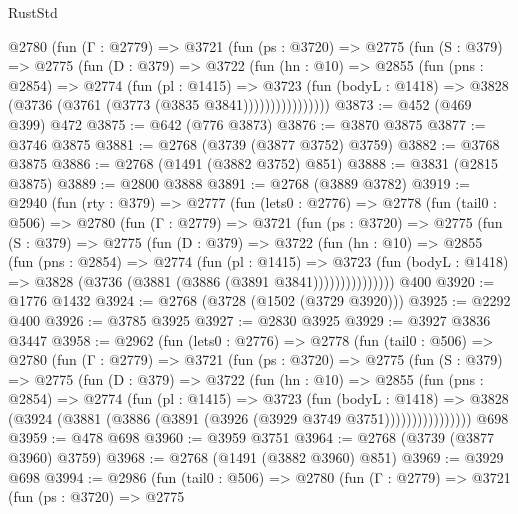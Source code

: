 \begin{lexlean}{RustStd}
\begin{coremodule}
          @2780
            (fun (Γ : @2779) =>
            @3721
              (fun (ps : @3720) =>
              @2775
                (fun (S : @379) =>
                @2775
                  (fun (D : @379) =>
                  @3722
                    (fun (hn : @10) =>
                    @2855
                      (fun (pns : @2854) =>
                      @2774
                        (fun (pl : @1415) =>
                        @3723
                          (fun (bodyL : @1418) =>
                          @3828 (@3736 (@3761 (@3773 (@3835 @3841))))))))))))))))
@3873 := @452 (@469 @399) @472
@3875 := @642 (@776 @3873)
@3876 := @3870 @3875
@3877 := @3746 @3875
@3881 := @2768 (@3739 (@3877 @3752) @3759)
@3882 := @3768 @3875
@3886 := @2768 (@1491 (@3882 @3752) @851)
@3888 := @3831 (@2815 @3875)
@3889 := @2800 @3888
@3891 := @2768 (@3889 @3782)
@3919 := @2940
    (fun (rty : @379) =>
    @2777
      (fun (lets0 : @2776) =>
      @2778
        (fun (tail0 : @506) =>
        @2780
          (fun (Γ : @2779) =>
          @3721
            (fun (ps : @3720) =>
            @2775
              (fun (S : @379) =>
              @2775
                (fun (D : @379) =>
                @3722
                  (fun (hn : @10) =>
                  @2855
                    (fun (pns : @2854) =>
                    @2774
                      (fun (pl : @1415) =>
                      @3723
                        (fun (bodyL : @1418) =>
                        @3828 (@3736 (@3881 (@3886 (@3891 @3841)))))))))))))))
    @400
@3920 := @1776 @1432
@3924 := @2768 (@3728 (@1502 (@3729 @3920)))
@3925 := @2292 @400
@3926 := @3785 @3925
@3927 := @2830 @3925
@3929 := @3927 @3836 @3447
@3958 := @2962
    (fun (lets0 : @2776) =>
    @2778
      (fun (tail0 : @506) =>
      @2780
        (fun (Γ : @2779) =>
        @3721
          (fun (ps : @3720) =>
          @2775
            (fun (S : @379) =>
            @2775
              (fun (D : @379) =>
              @3722
                (fun (hn : @10) =>
                @2855
                  (fun (pns : @2854) =>
                  @2774
                    (fun (pl : @1415) =>
                    @3723
                      (fun (bodyL : @1418) =>
                      @3828 (@3924 (@3881 (@3886 (@3891 (@3926 (@3929 @3749 @3751))))))))))))))))
    @698
@3959 := @478 @698
@3960 := @3959 @3751
@3964 := @2768 (@3739 (@3877 @3960) @3759)
@3968 := @2768 (@1491 (@3882 @3960) @851)
@3969 := @3929 @698
@3994 := @2986
    (fun (tail0 : @506) =>
    @2780
      (fun (Γ : @2779) =>
      @3721
        (fun (ps : @3720) =>
        @2775

\end{coremodule}
\end{lexlean}
